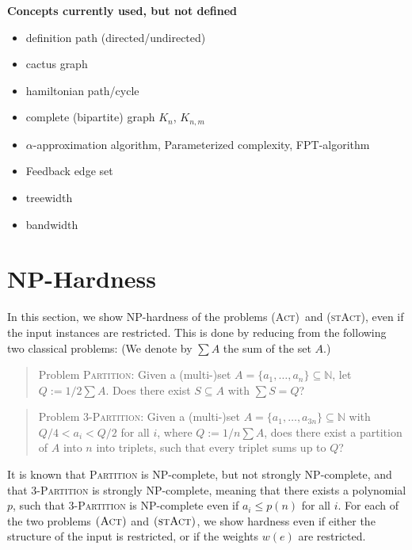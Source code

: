 \documentclass[runningheads]{llncs}
\numberwithin{equation}{section}
\newcommand{\N}{\mathbb{N}}
\newcommand{\set}[1]{\{ #1 \}}
\newcommand{\act}{\textsc{(Act)}}
\newcommand{\stact}{\textsc{(stAct)}}
\begin{document}
\textbf{ Concepts currently used, but not defined }
\begin{itemize}
\item definition path (directed/undirected)
\item cactus graph
\item hamiltonian path/cycle
\item complete (bipartite) graph $K_n$, $K_{n,m}$
\item $\alpha$-approximation algorithm, Parameterized complexity, FPT-algorithm
\item Feedback edge set
\item treewidth
\item bandwidth
\end{itemize}

\section{NP-Hardness}
\label{sec:hardness}

In this section, we show NP-hardness of the problems \act\ and \stact, even if the input instances are restricted. This is done by reducing from the following two classical problems: (We denote by $\sum A$ the sum of the set $A$.)

\begin{quote}

Problem \textsc{Partition}: Given a (multi-)set $A = \set{a_1, \ldots, a_n} \subseteq \N$, let $Q := 1/2 \sum A$. Does there exist $S \subseteq A$ with $\sum S = Q$?

\end{quote}
\begin{quote}

Problem \textsc{3-Partition}: Given a (multi-)set $A = \set{a_1, \ldots, a_{3n}} \subseteq \N$ with $Q/4 < a_i < Q/2$ for all $i$, where $Q := 1/n \sum A$, does there exist a partition of $A$ into $n$ into triplets, such that every triplet sums up to $Q$?

\end{quote}

It is known that \textsc{Partition} is NP-complete, but not strongly NP-complete, and that \textsc{3-Partition} is strongly NP-complete, meaning that there exists a polynomial $p$, such that \textsc{3-Partition} is NP-complete even if $a_i \leq p(n)$ for all $i$.
For each of the two problems $\act$ and $\stact$, we show hardness even if either the structure of the input is restricted, or if the weights $w(e)$ are restricted.
\end{document}
